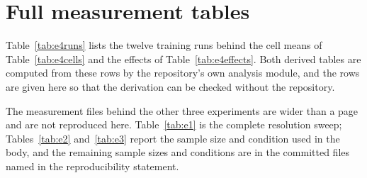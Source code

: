 \section{Full measurement tables}
\label{app:tables}

Table~\ref{tab:e4runs} lists the twelve training runs behind the cell means
of Table~\ref{tab:e4cells} and the effects of Table~\ref{tab:e4effects}.
Both derived tables are computed from these rows by the repository's own
analysis module, and the rows are given here so that the derivation can be
checked without the repository.

The measurement files behind the other three experiments are wider than a
page and are not reproduced here. Table~\ref{tab:e1} is the complete
resolution sweep; Tables~\ref{tab:e2} and~\ref{tab:e3} report the
sample size and condition used in the body, and the remaining sample sizes
and conditions are in the committed files named in the
reproducibility statement.


